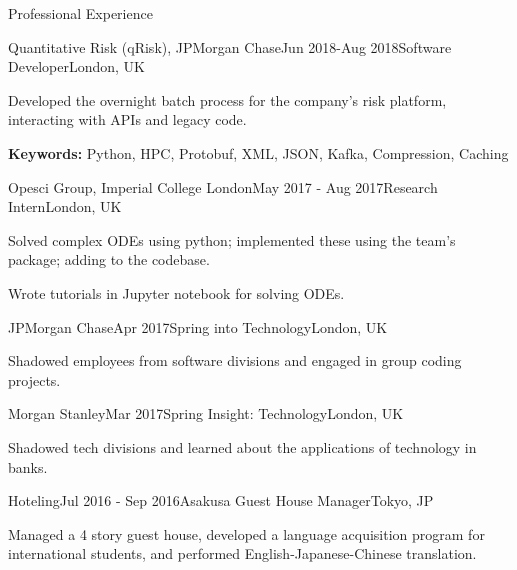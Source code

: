 \documentclass[10pt]{resume} %
\begin{document}
\begin{rSection}{Professional Experience}


\begin{rSubsection}{Quantitative Risk (qRisk), JPMorgan Chase}{Jun 2018-Aug 2018}{Software
Developer}{London, UK}
  \item Developed the overnight batch process for the company's risk platform,
  interacting with APIs and legacy code.
  \item \textbf{Keywords:} Python, HPC, Protobuf, XML, JSON, Kafka, Compression,
  Caching
\end{rSubsection}


\begin{rSubsection}{Opesci Group, Imperial College London}{May 2017 - Aug 2017}{Research Intern}{London, UK}
    \item Solved complex ODEs using python; implemented these using the
    team's package; adding to the codebase.
    \item Wrote tutorials in Jupyter notebook for solving ODEs.
\end{rSubsection}


\begin{rSubsection}{JPMorgan Chase}{Apr 2017}{Spring into Technology}{London, UK}
    \item Shadowed employees from software divisions and engaged in group
    coding projects.
\end{rSubsection}


\begin{rSubsection}{Morgan Stanley}{Mar 2017}{Spring Insight: Technology}{London, UK}
    \item Shadowed tech divisions and learned about the applications of
    technology in banks.
\end{rSubsection}


\begin{rSubsection}{Hoteling}{Jul 2016 - Sep 2016}{Asakusa Guest House Manager}{Tokyo, JP}
    \item Managed a 4 story guest house, developed a language acquisition
    program for international students, and performed English-Japanese-Chinese
    translation.
\end{rSubsection}


\end{rSection}
\end{document}
